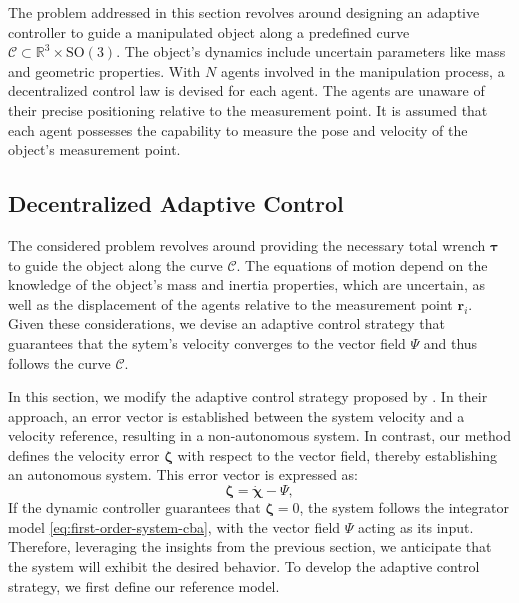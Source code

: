 The problem addressed in this section revolves around designing an adaptive controller to guide a manipulated object along a predefined curve $\mathcal{C} \subset \mathbb{R}^3\times \text{SO}(3)$. The object's dynamics include uncertain parameters like mass and geometric properties. With $N$ agents involved in the manipulation process, a decentralized control law is devised for each agent. The agents are unaware of their precise positioning relative to the measurement point. It is assumed that each agent possesses the capability to measure the pose and velocity of the object's measurement point.
\subsection{Decentralized Adaptive Control}
The considered problem revolves around providing the necessary total wrench $\boldsymbol{\tau}$ to guide the object along the curve $\mathcal{C}$. The equations of motion depend on the knowledge of the object's mass and inertia properties, which are uncertain, as well as the displacement of the agents relative to the measurement point $\mathbf{r}_i$. Given these considerations, we devise an adaptive control strategy that guarantees that the sytem's velocity converges to the vector field $\Psi$ and thus follows the curve $\mathcal{C}$.

In this section, we modify the adaptive control strategy proposed by \cite{Culbertson2021}. In their approach, an error vector is established between the system velocity and a velocity reference, resulting in a non-autonomous system. In contrast, our method defines the velocity error $\boldsymbol{\zeta}$ with respect to the vector field, thereby establishing an autonomous system. This error vector is expressed as:
\begin{equation}
    \boldsymbol{\zeta} = \dot{\boldsymbol{\chi}} - \Psi,\label{eq:errorvector-s}
\end{equation}
If the dynamic controller guarantees that $\boldsymbol{\zeta}=0$, the system follows the integrator model \eqref{eq:first-order-system-cba}, with the vector field $\Psi$ acting as its input. Therefore, leveraging the insights from the previous section, we anticipate that the system will exhibit the desired behavior. To develop the adaptive control strategy, we first define our reference model.

